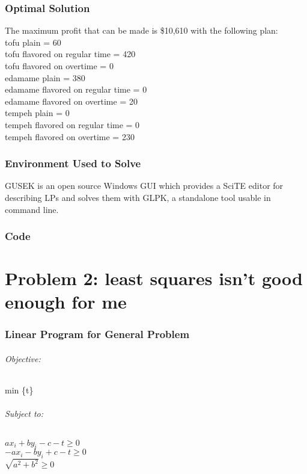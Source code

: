 \documentclass{article}
\begin{document}
\section*{Optimal Solution}
The maximum profit that can be made is \$10,610 with the following plan:\\
tofu plain = 60\\
tofu flavored on regular time = 420\\
tofu flavored on overtime = 0\\
edamame plain = 380\\
edamame flavored on regular time = 0\\
edamame flavored on overtime = 20\\
tempeh plain = 0\\
tempeh flavored on regular time = 0\\
tempeh flavored on overtime = 230\\

\section*{Environment Used to Solve}
GUSEK is an open source Windows GUI which provides a SciTE editor for describing LPs and solves them with GLPK, a standalone tool usable in command line.

\section*{Code}


\pagebreak


\part*{Problem 2: least squares isn't good enough for me}
\section*{Linear Program for General Problem}
\paragraph*{Objective:}
min \{t\}

\paragraph*{Subject to:\\}
$ax_i + by_i - c - t \geq 0$\\
$-ax_i - by_i + c - t \geq 0$\\
$\sqrt{a^2 + b^2} \geq 0$
\end{document}
